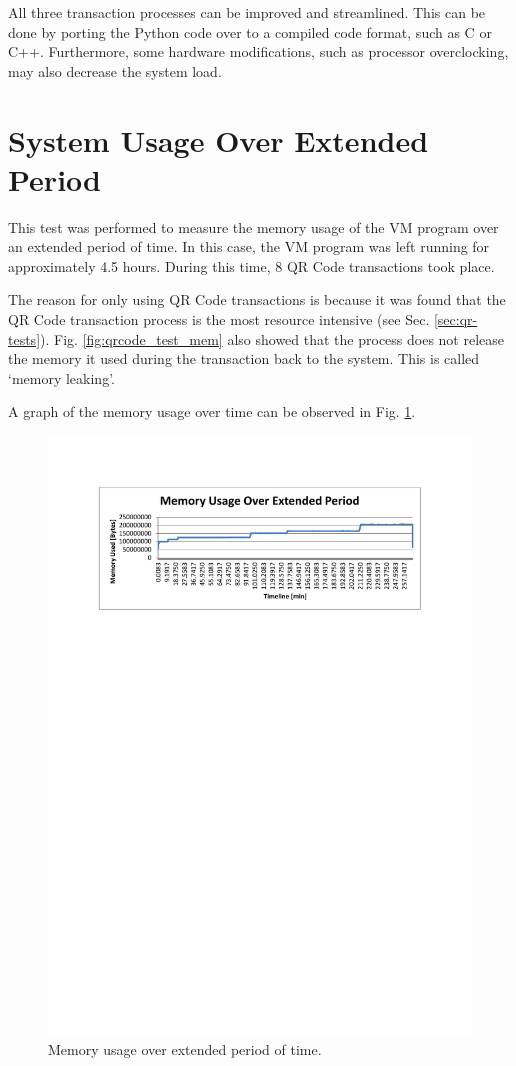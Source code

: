 All three transaction processes can be improved and streamlined. This can be
done by porting the Python code over to a compiled code format, such as C or
C++. Furthermore, some hardware modifications, such as processor overclocking,
may also decrease the system load.

\section{System Usage Over Extended Period}
\label{sec:memory_leak}

This test was performed to measure the memory usage of the VM program over an
extended period of time. In this case, the VM program was left running for
approximately 4.5 hours. During this time, 8 QR Code transactions took place. 

The reason for only using QR Code transactions is because it was found that the
QR Code transaction process is the most resource intensive (see Sec.
\ref{sec:qr-tests}). Fig. \ref{fig:qrcode_test_mem} also showed that the process
does not release the memory it used during the transaction back to the system.
This is called `memory leaking'.

A graph of the memory usage over time can be observed in Fig.
\ref{fig:long-test}.

\begin{figure}
 \centering 
 \includegraphics[clip=true, trim = 50 590 0 70,
 scale=0.9]{extended_test}
 \caption{Memory usage over extended period of time.}
 \label{fig:long-test}
\end{figure}

